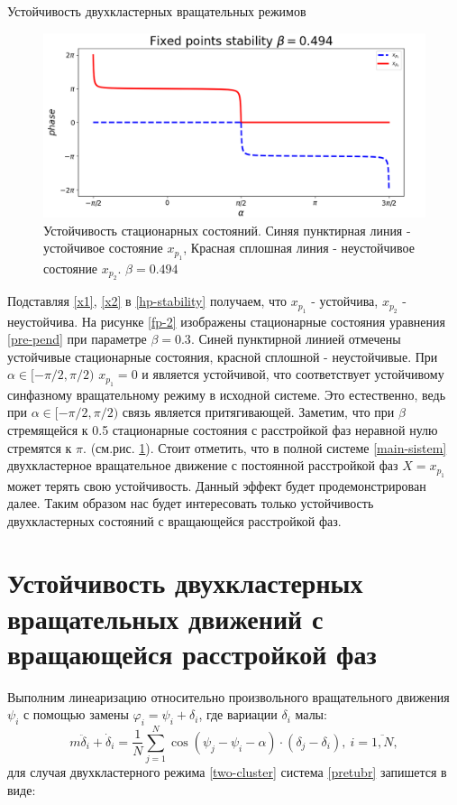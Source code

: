 \begin{chapter}{Устойчивость двухкластерных вращательных режимов}
	\begin{figure}[h!]
		\begin{center}
			\includegraphics[width=1\columnwidth]{pictures/fixed-points-3.png}
		\end{center}
		\caption{Устойчивость стационарных состояний.
		Синяя пунктирная линия - устойчивое состояние $x_{p_1}$,
		Красная сплошная линия - неустойчивое состояние $x_{p_2}$.
		$\beta = 0.494$}
		\label{fp-3}
	\end{figure}
	Подставляя \eqref{x1}, \eqref{x2} в \eqref{hp-stability} получаем, что $x_{p_1}$ - устойчива, $x_{p_2}$ - неустойчива. На рисунке \ref{fp-2} изображены стационарные состояния уравнения \eqref{pre-pend} при параметре $\beta = 0.3$.
	Синей пунктирной линией отмечены устойчивые стационарные состояния,
	красной сплошной - неустойчивые. При $\alpha \in [-\pi/2, \pi/2)$ $x_{p_1} = 0$ и является устойчивой, что соответствует
	устойчивому синфазному вращательному режиму в исходной системе. Это естественно, ведь при $\alpha \in [-\pi/2, \pi/2)$ связь является
	притягивающей. Заметим, что при $\beta$ стремящейся к 0.5 стационарные состояния с расстройкой фаз неравной нулю стремятся
	к $\pi$. (см.рис. \ref{fp-3}).
	Стоит отметить, что в полной системе \eqref{main-sistem} двухкластерное вращательное движение с постоянной расстройкой фаз $X = x_{p_1}$
	может терять свою устойчивость. Данный эффект будет продемонстрирован далее.
	Таким образом нас будет интересовать только устойчивость двухкластерных состояний с вращающейся расстройкой фаз.
	
	\section{Устойчивость двухкластерных вращательных движений с вращающейся расстройкой фаз}

	Выполним линеаризацию относительно произвольного вращательного движения $\psi_i$ с помощью замены $\varphi_i = \psi_i + \delta_i$, где вариации $\delta_i$ малы:
	\begin{equation} \label{pretubr}
		m\ddot{\delta}_i + \dot{\delta}_i = \frac{1}{N} \sum_{j = 1}^N \cos{(\psi_j - \psi_i - \alpha)} \cdot (\delta_j - \delta_i), \ i = \overline{1, N},
	\end{equation}
	для случая двухкластерного режима \eqref{two-cluster} система \eqref{pretubr} запишется в виде:
	

\end{chapter}

